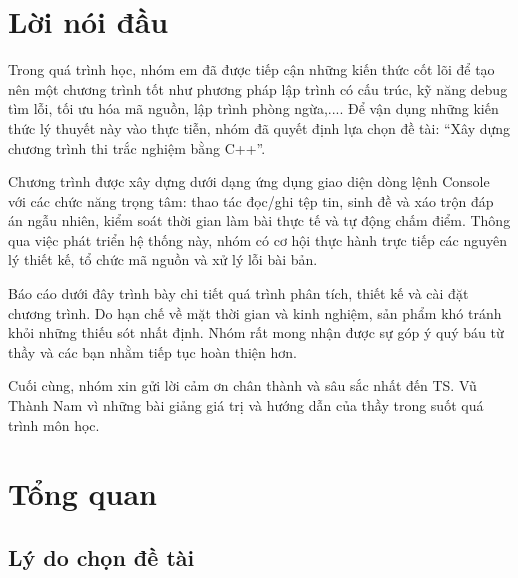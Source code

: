 \documentclass[12pt,a4paper]{report}
\begin{document}
\renewcommand{\thesection}{\arabic{section}}
\renewcommand{\thesubsection}{\thesection.\arabic{subsection}}
\renewcommand{\thesubsubsection}{\thesubsection.\arabic{subsubsection}}
\renewcommand{\thetable}{\arabic{table}}
\renewcommand{\thefigure}{\arabic{figure}}
\renewcommand{\theequation}{\arabic{equation}}
\makeatletter
{}
\makeatother

\tableofcontents
\newpage

\section*{Lời nói đầu}

Trong quá trình học, nhóm em đã được tiếp cận những kiến thức cốt lõi để tạo nên một chương trình tốt như phương pháp lập trình có cấu trúc, kỹ năng debug tìm lỗi, tối ưu hóa mã nguồn, lập trình phòng ngừa,.... Để vận dụng những kiến thức lý thuyết này vào thực tiễn, nhóm đã quyết định lựa chọn đề tài: “Xây dựng chương trình thi trắc nghiệm bằng C++”.

Chương trình được xây dựng dưới dạng ứng dụng giao diện dòng lệnh Console với các chức năng trọng tâm: thao tác đọc/ghi tệp tin, sinh đề và xáo trộn đáp án ngẫu nhiên, kiểm soát thời gian làm bài thực tế và tự động chấm điểm. Thông qua việc phát triển hệ thống này, nhóm có cơ hội thực hành trực tiếp các nguyên lý thiết kế, tổ chức mã nguồn và xử lý lỗi bài bản.

Báo cáo dưới đây trình bày chi tiết quá trình phân tích, thiết kế và cài đặt chương trình. Do hạn chế về mặt thời gian và kinh nghiệm, sản phẩm khó tránh khỏi những thiếu sót nhất định. Nhóm rất mong nhận được sự góp ý quý báu từ thầy và các bạn nhằm tiếp tục hoàn thiện hơn.

Cuối cùng, nhóm xin gửi lời cảm ơn chân thành và sâu sắc nhất đến TS. Vũ Thành Nam vì những bài giảng giá trị và hướng dẫn của thầy trong suốt quá trình môn học.

\newpage
\setcounter{section}{0}

\section{Tổng quan}

\subsection{Lý do chọn đề tài}
\end{document}
